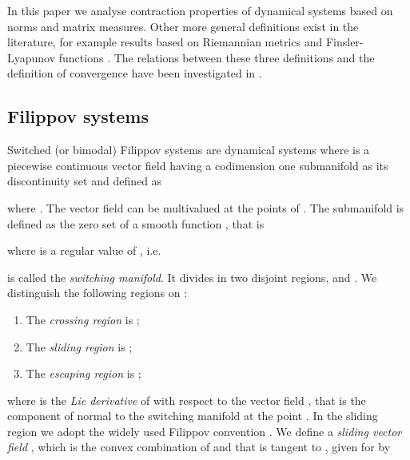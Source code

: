 \documentclass[twocolumn]{autart}
\begin{document}
In this paper we analyse contraction properties of dynamical systems based on norms and matrix measures. Other more general definitions exist in the literature, for example results based on Riemannian metrics \citep{lohmiller1998contraction} and Finsler-Lyapunov functions \citep{forni2014differential}. The relations between these three definitions and the definition of convergence \citep{pavlov2004convergent} have been investigated in \citep{forni2014differential}.
\subsection{Filippov systems}
Switched (or bimodal) Filippov systems are dynamical systems  where  is a piecewise continuous vector field having a codimension one submanifold  as its discontinuity set and defined as 

where . The vector field  can be multivalued at the points of .
The submanifold  is defined as the zero set of a smooth function , that is

where  is a regular value of , i.e. 

 is called the {\it switching manifold}. It divides  in two disjoint regions,  and .
We distinguish the following regions on :
\begin{enumerate}
\item
The \emph{crossing region} is ;
\item
The \emph{sliding region} is ;
\item
The \emph{escaping region} is ;
\end{enumerate}
where  is the \emph{Lie derivative} of  with respect to the vector field , that is the component of  normal to the switching manifold at the point . In the sliding region we adopt the widely used Filippov convention \citep{filippov1988differential}. We define a \emph{sliding vector field} , which is the convex combination of  and  that is tangent to , given for  by 
\end{document}
